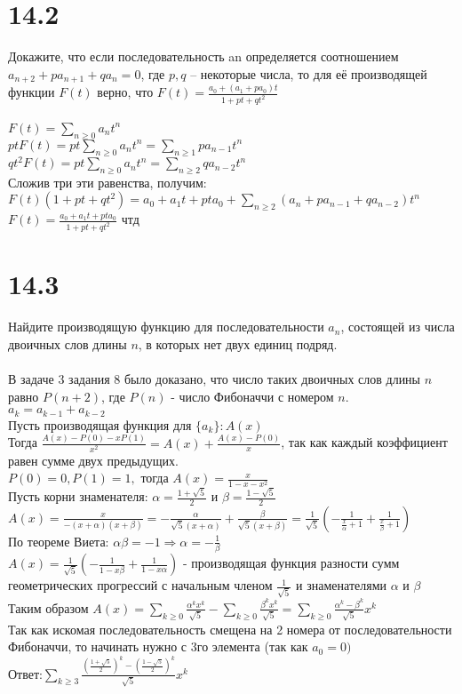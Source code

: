 \documentclass{article}
\begin{document}
\section{14.2}
Докажите, что если последовательность an определяется соотношением
$a_{n+2}+ pa_{n+1}+ qa_n = 0$,
где $p, q$ – некоторые числа, то для её производящей функции $F(t)$ верно,
что
$F(t) = \frac{a_0 + (a_1 + pa_0)t}{1 + pt + qt^2}$\\
\\
$F(t)=\sum\limits_{n\geqslant0}a_nt^n$\\
$ptF(t)=pt\sum\limits_{n\geqslant0}a_nt^n=\sum\limits_{n\geqslant1}pa_{n-1}t^n$\\
$qt^2F(t)=pt\sum\limits_{n\geqslant0}a_nt^n=\sum\limits_{n\geqslant2}qa_{n-2}t^n$\\
Сложив три эти равенства, получим:\\
$F(t)(1+pt+qt^2)=a_0+a_1t+pta_0+\sum\limits_{n\geqslant2}(a_n+pa_{n-1}+qa_{n-2})t^n$\\
$F(t)=\frac{a_0+a_1t+pta_0}{1+pt+qt^2}$ чтд
\section{14.3}
Найдите производящую функцию для последовательности $a_n$, состоящей из числа двоичных слов длины $n$, в которых нет двух единиц подряд.\\\\
В задаче 3 задания 8 было доказано, что число таких двоичных слов длины $n$ равно $P(n+2)$, где $P(n)$ - число Фибоначчи с номером $n$.\\
$a_k=a_{k-1}+a_{k-2}$\\
Пусть производящая функция для $\{a_k\}: A(x)$\\
Тогда $\frac{A(x)-P(0)-xP(1)}{x^2}=A(x)+\frac{A(x)-P(0)}{x}$, так как каждый коэффициент равен сумме двух предыдущих.\\
$P(0)=0, P(1)=1,$ тогда $A(x)=\frac{x}{1-x-x^2}$\\
Пусть корни знаменателя: $\alpha=\frac{1+\sqrt5}{2}$ и $\beta=\frac{1-\sqrt5}{2}$\\
$A(x)=\frac{x}{-(x+\alpha)(x+\beta)}=-\frac{\alpha}{\sqrt{5}(x+\alpha)}+\frac{\beta}{\sqrt{5}(x+\beta)}=\frac{1}{\sqrt{5}}(-\frac{1}{\frac{x}{\alpha}+1}+\frac{1}{\frac{x}{\beta}+1})$\\
По теореме Виета: $\alpha\beta = -1 \Longrightarrow \alpha=-\frac{1}{\beta}$\\
$A(x)=\frac{1}{\sqrt{5}}(-\frac{1}{1-x\beta}+\frac{1}{1-x\alpha})$ - производящая функция разности сумм геометрических прогрессий с начальным членом $\frac{1}{\sqrt5}$ и знаменателями $\alpha$ и $\beta$\\
Таким образом $A(x)=\sum\limits_{k\geqslant0}\frac{\alpha^kx^k}{\sqrt5}-\sum\limits_{k\geqslant0}\frac{\beta^kx^k}{\sqrt5}=\sum\limits_{k\geqslant0}\frac{\alpha^k-\beta^k}{\sqrt5}x^k$\\
Так как искомая последовательность смещена на 2 номера от последовательности Фибоначчи, то начинать нужно с 3го элемента (так как $a_0=0)$
\\Ответ:$\sum\limits_{k\geqslant3}\frac{(\frac{1+\sqrt5}{2})^k-(\frac{1-\sqrt5}{2})^k}{\sqrt5}x^k$
\end{document}
